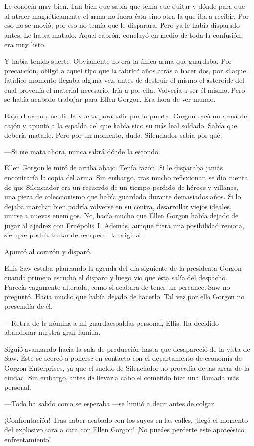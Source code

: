 Le conocía muy bien. Tan bien que sabía qué tenía que quitar y dónde para que al atraer magnéticamente el arma no fuera ésta sino otra la que iba a recibir. Por eso no se movió, por eso no temía que le disparara. Pero ya le había disparado antes. Le había matado. Aquel cabrón, concluyó en medio de toda la confusión, era muy listo.

Y había tenido suerte. Obviamente no era la única arma que guardaba. Por precaución, obligó a aquel tipo que la fabricó años atrás a hacer dos, por si aquel fatídico momento llegaba alguna vez, antes de destruir él mismo el asteroide del cual provenía el material necesario. Iría a por ella. Volvería a ser él mismo. Pero se había acabado trabajar para Ellen Gorgon. Era hora de ver mundo.

Bajó el arma y se dio la vuelta para salir por la puerta. Gorgon sacó un arma del cajón y apuntó a la espalda del que había sido su más leal soldado. Sabía que debería matarle. Pero por un momento, dudó. Silenciador sabía por qué.

---Si me mata ahora, nunca sabrá dónde la escondo.

Ellen Gorgon le miró de arriba abajo. Tenía razón. Si le disparaba jamás encontraría la copia del arma. Sin embargo, tras mucho reflexionar, se dio cuenta de que Silenciador era un recuerdo de un tiempo perdido de héroes y villanos, una pieza de coleccionismo que había guardado durante demasiados años. Si lo dejaba marchar bien podría volverse en su contra, desarrollar viejos ideales, unirse a nuevos enemigos. No, hacía mucho que Ellen Gorgon había dejado de jugar al ajedrez con Ernépolis~I. Además, aunque fuera una posibilidad remota, siempre podría tratar de recuperar la original.

Apuntó al corazón y disparó.

Ellis Saw estaba planeando la agenda del día siguiente de la presidenta Gorgon cuando primero escuchó el disparo y luego vio que ésta salía del despacho. Parecía vagamente alterada, como si acabara de tener un percance. Saw no preguntó. Hacía mucho que había dejado de hacerlo. Tal vez por ello Gorgon no prescindía de él.

---Retira de la nómina a mi guardaespaldas personal, Ellis. Ha decidido abandonar nuestra gran familia.

Siguió avanzando hacia la sala de producción hasta que desapareció de la vista de Saw. Éste se acercó a ponerse en contacto con el departamento de economía de Gorgon Enterprises, ya que el sueldo de Silenciador no procedía de las arcas de la ciudad. Sin embargo, antes de llevar a cabo el cometido hizo una llamada más personal.

---Todo ha salido como se esperaba ---se limitó a decir antes de colgar.

\begin{next}
    ¡Confrontación! Tras haber acabado con los suyos en las calles, ¡llegó el momento del explosivo cara a cara con Ellen Gorgon! ¡No puedes perderte este apoteósico enfrentamiento!
\end{next}

\endinput

